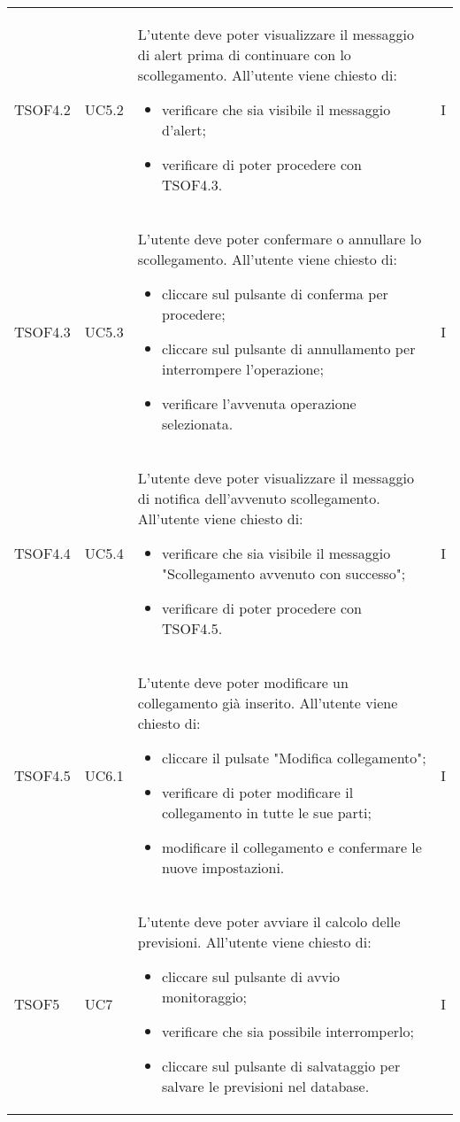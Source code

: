 \begin{longtable}{C{2.5cm} C{2.5cm} L{8cm} C{2cm}}
TSOF4.2 &
UC5.2 &
L'utente deve poter visualizzare il messaggio di alert prima di continuare con lo scollegamento. All'utente viene chiesto di:
\begin{itemize}
	\item verificare che sia visibile il messaggio d'alert;
	\item verificare di poter procedere con TSOF4.3.
\end{itemize}&
I \\

TSOF4.3 &
UC5.3 &
L'utente deve poter confermare o annullare lo scollegamento. All'utente viene chiesto di:
\begin{itemize}
	\item cliccare sul pulsante di conferma per procedere;
	\item cliccare sul pulsante di annullamento per interrompere l'operazione;
	\item verificare l'avvenuta operazione selezionata.
\end{itemize}&
I \\

TSOF4.4 &
UC5.4 &
L'utente deve poter visualizzare il messaggio di notifica dell'avvenuto scollegamento. All'utente viene chiesto di:
\begin{itemize}
	\item verificare che sia visibile il messaggio "Scollegamento avvenuto con successo";
	\item verificare di poter procedere con TSOF4.5.
\end{itemize}&
I \\

TSOF4.5 &
UC6.1 &
L'utente deve poter modificare un collegamento già inserito. All'utente viene chiesto di:
\begin{itemize}
	\item cliccare il pulsate "Modifica collegamento";
	\item verificare di poter modificare il collegamento in tutte le sue parti;
	\item modificare il collegamento e confermare le nuove impostazioni.
\end{itemize}&
I \\




TSOF5 &
UC7 &
L'utente deve poter avviare il calcolo delle previsioni. All'utente viene chiesto di:
\begin{itemize}
	\item cliccare sul pulsante di avvio monitoraggio;
	\item verificare che sia possibile interromperlo;
	\item cliccare sul pulsante di salvataggio per salvare le previsioni nel database.
\end{itemize}&
I \\


\end{longtable}

